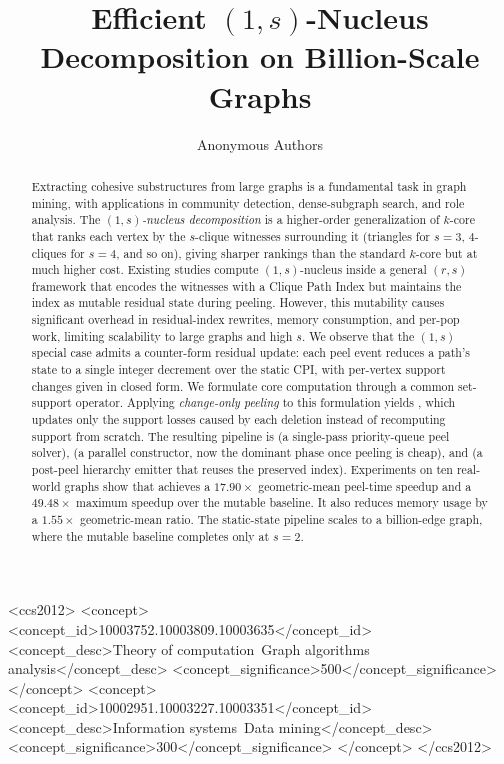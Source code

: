 \documentclass[sigconf]{acmart}
\begin{document}
\title{Efficient \texorpdfstring{$(1,s)$}{(1,s)}-Nucleus Decomposition on Billion-Scale Graphs}

\author{Anonymous Authors}

\begin{abstract}
Extracting cohesive substructures from large graphs is a fundamental task in graph mining, with applications in community detection, dense-subgraph search, and role analysis.
%
The \emph{$(1,s)$-nucleus decomposition} is a higher-order generalization of $k$-core that ranks each vertex by the $s$-clique witnesses surrounding it (triangles for $s=3$, $4$-cliques for $s=4$, and so on), giving sharper rankings than the standard $k$-core but at much higher cost.
%
Existing studies compute $(1,s)$-nucleus inside a general $(r,s)$ framework that encodes the witnesses with a Clique Path Index but maintains the index as mutable residual state during peeling.
%
However, this mutability causes significant overhead in residual-index rewrites, memory consumption, and per-pop work, limiting scalability to large graphs and high $s$.
%
We observe that the $(1,s)$ special case admits a counter-form residual update: each peel event reduces a path's state to a single integer decrement over the static CPI, with per-vertex support changes given in closed form.
%
We formulate core computation through a common set-support operator.
%
Applying \emph{change-only peeling} to this formulation yields \spinStar{}, which updates only the support losses caused by each deletion instead of recomputing support from scratch.
%
The resulting pipeline is \spinStar{} (a single-pass priority-queue peel solver), \paraBuild{} (a parallel \cpi{} constructor, now the dominant phase once peeling is cheap), and \buildHier{} (a post-peel hierarchy emitter that reuses the preserved index).
%
Experiments on ten real-world graphs show that \spinStar{} achieves a $17.90\times$ geometric-mean peel-time speedup and a $49.48\times$ maximum speedup over the mutable baseline.
%
It also reduces memory usage by a $1.55\times$ geometric-mean ratio.
%
The static-state pipeline scales to a billion-edge graph, where the mutable baseline completes only at $s{=}2$.
\end{abstract}

\begin{CCSXML}
<ccs2012>
 <concept>
  <concept_id>10003752.10003809.10003635</concept_id>
  <concept_desc>Theory of computation~Graph algorithms analysis</concept_desc>
  <concept_significance>500</concept_significance>
 </concept>
 <concept>
  <concept_id>10002951.10003227.10003351</concept_id>
  <concept_desc>Information systems~Data mining</concept_desc>
  <concept_significance>300</concept_significance>
 </concept>
</ccs2012>
\end{CCSXML}
\end{document}
